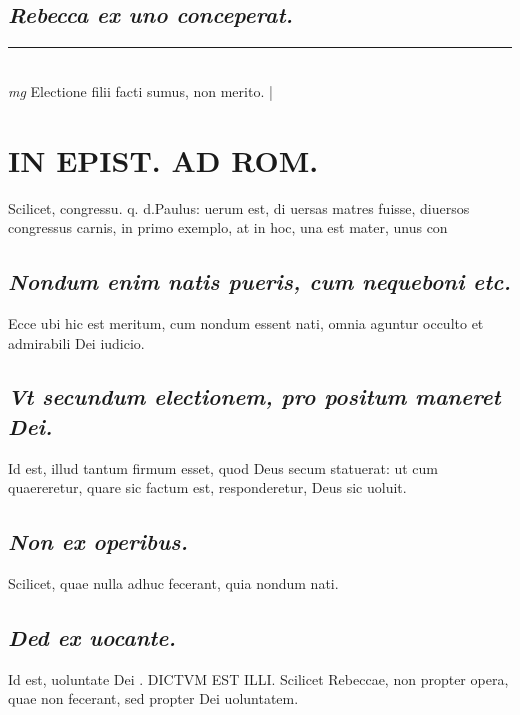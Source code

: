 \documentclass{article}
\begin{document}
\begin{pages}
\subsection*{\textit{Rebecca ex uno conceperat. }}\pstart  \pend
\vspace{0.5cm}\noindent
\vspace{0.2cm}\rule{1cm}{0.2pt}\\ 
\hspace{0.2cm}\textit{mg}
\footnotesize Electione filii facti sumus, non merito.  
\normalsize| 
\section*{IN EPIST. AD ROM.  }
\marginpar{[ p.m ]}\pstart Scilicet, congressu. q. d.Paulus: uerum est, di uersas matres fuisse, diuersos congressus carnis, in primo exemplo, at in hoc, una est mater, unus con  \pend
{}
{}
\subsection*{\textit{Nondum enim natis pueris, cum nequeboni etc. }}\pstart Ecce ubi hic est meritum, cum nondum essent nati, omnia aguntur occulto et admirabili Dei iudicio.  \pend
{}
{}
\subsection*{\textit{Vt secundum electionem, pro positum maneret Dei. }}\pstart Id est, illud tantum firmum esset, quod Deus secum statuerat: ut cum quaereretur, quare sic factum est, responderetur, Deus sic uoluit.   \pend
{}
{}
\subsection*{\textit{Non ex operibus. }}\pstart Scilicet, quae nulla adhuc fecerant, quia nondum nati.   \pend
{}
{}
\subsection*{\textit{Ded ex uocante. }}\pstart Id est, uoluntate Dei . DICTVM EST ILLI. Scilicet Rebeccae, non propter opera, quae non fecerant, sed propter Dei uoluntatem.   \pend
{}
{}

\end{pages}
\end{document}
